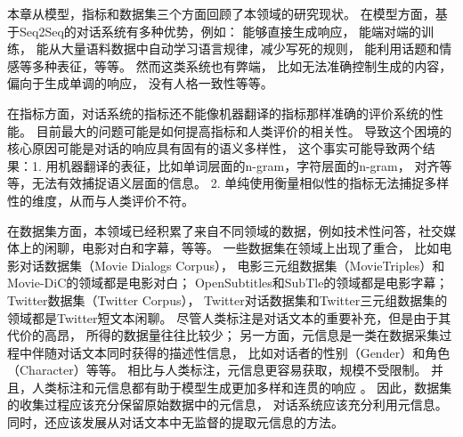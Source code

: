 本章从模型，指标和数据集三个方面回顾了本领域的研究现状。
在模型方面，基于Seq2Seq的对话系统有多种优势，例如：
能够直接生成响应，
能端对端的训练，
能从大量语料数据中自动学习语言规律，减少写死的规则，
能利用话题和情感等多种表征，等等。
然而这类系统也有弊端，
比如无法准确控制生成的内容，
偏向于生成单调的响应，
没有人格一致性等等。

在指标方面，对话系统的指标还不能像机器翻译的指标那样准确的评价系统的性能。
目前最大的问题可能是如何提高指标和人类评价的相关性。
导致这个困境的核心原因可能是对话的响应具有固有的语义多样性，
这个事实可能导致两个结果：1. 用机器翻译的表征，比如单词层面的n-gram，字符层面的n-gram，
对齐等等，无法有效捕捉语义层面的信息。
2. 单纯使用衡量相似性的指标无法捕捉多样性的维度，从而与人类评价不符。

在数据集方面，本领域已经积累了来自不同领域的数据，例如技术性问答，社交媒体上的闲聊，电影对白和字幕，等等。
一些数据集在领域上出现了重合，
比如电影对话数据集（Movie Dialogs Corpus），
电影三元组数据集（MovieTriples）和Movie-DiC的领域都是电影对白；
OpenSubtitles和SubTle的领域都是电影字幕；
Twitter数据集（Twitter Corpus），
Twitter对话数据集和Twitter三元组数据集的领域都是Twitter短文本闲聊。
尽管人类标注是对话文本的重要补充，但是由于其代价的高昂，
所得的数据量往往比较少；
另一方面，元信息是一类在数据采集过程中伴随对话文本同时获得的描述性信息，
比如对话者的性别（Gender）和角色（Character）等等。
相比与人类标注，元信息更容易获取，规模不受限制。
并且，人类标注和元信息都有助于模型生成更加多样和连贯的响应
。
因此，数据集的收集过程应该充分保留原始数据中的元信息，
对话系统应该充分利用元信息。
同时，还应该发展从对话文本中无监督的提取元信息的方法。
